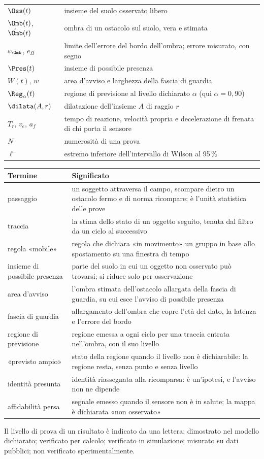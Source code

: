 {\begin{tabularx}{\textwidth}{@{}p{2.6cm}L@{}}
$\Oss(t)$ & insieme del suolo osservato libero\\
$\Omb(t)$, $\hat\Omb(t)$ & ombra di un ostacolo sul suolo, vera e stimata\\
$\varepsilon_\Omb$, $e_\Omega$ & limite dell'errore del bordo dell'ombra; errore misurato, con segno\\
$\Pres(t)$ & insieme di possibile presenza\\
$W(t)$, $w$ & area d'avviso e larghezza della fascia di guardia\\
$\Reg_\alpha(t)$ & regione di previsione al livello dichiarato $\alpha$ (qui $\alpha=0{,}90$)\\
$\dilata(A,r)$ & dilatazione dell'insieme $A$ di raggio $r$\\
$T_r$, $v_e$, $a_f$ & tempo di reazione, velocità propria e decelerazione di frenata di chi porta il sensore\\
$N$ & numerosità di una prova\\
$\ell^-$ & estremo inferiore dell'intervallo di Wilson al 95\,\%\\
\bottomrule
\end{tabularx}

\medskip
\begin{tabularx}{\textwidth}{@{}p{3.6cm}L@{}}
\toprule
Termine & Significato\\
\midrule
passaggio & un soggetto attraversa il campo, scompare dietro un ostacolo fermo e di norma ricompare; è l'unità statistica delle prove\\
traccia & la stima dello stato di un oggetto seguito, tenuta dal filtro da un ciclo al successivo\\
regola «mobile» & regola che dichiara «in movimento» un gruppo in base allo spostamento su una finestra di tempo\\
insieme di possibile presenza & parte del suolo in cui un oggetto non osservato può trovarsi; si riduce solo per osservazione\\
area d'avviso & l'ombra stimata dell'ostacolo allargata della fascia di guardia, su cui esce l'avviso di possibile presenza\\
fascia di guardia & allargamento dell'ombra che copre l'età del dato, la latenza e l'errore del bordo\\
regione di previsione & regione emessa a ogni ciclo per una traccia entrata nell'ombra, con il suo livello\\
«previsto ampio» & stato della regione quando il livello non è dichiarabile: la regione resta, senza punto e senza livello\\
identità presunta & identità riassegnata alla ricomparsa: è un'ipotesi, e l'avviso non ne dipende\\
affidabilità persa & segnale emesso quando il sensore non è in salute; la mappa è dichiarata «non osservato»\\
\bottomrule
\end{tabularx}}

Il livello di prova di un risultato è indicato da una lettera:  dimostrato nel modello dichiarato;  verificato per calcolo;  verificato in simulazione;  misurato su dati pubblici;  non verificato sperimentalmente.
